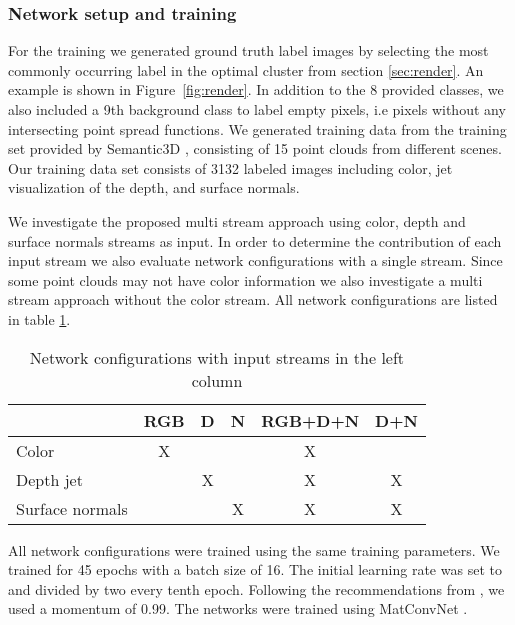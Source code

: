 \documentclass[runningheads,a4paper]{llncs}
\begin{document}
\subsubsection{Network setup and training}
For the training we generated ground truth label images by selecting the most commonly occurring label in the optimal cluster from section \ref{sec:render}. An example is shown in Figure~\ref{fig:render}. In addition to the 8 provided classes, we also included a 9th background class to label empty pixels, i.e pixels without any intersecting point spread functions. We generated training data from the training set provided by Semantic3D \cite{hackel2017semantic3d}, consisting of 15 point clouds from different scenes. Our training data set consists of 3132 labeled images including color, jet visualization of the depth, and surface normals. 

We investigate the proposed multi stream approach using color, depth and surface normals streams as input. In order to determine the contribution of each input stream we also evaluate network configurations with a single stream. Since some point clouds may not have color information we also investigate a multi stream approach without the color stream. All network configurations are listed in table \ref{tab:networks}.

\begin{table}
	\centering
	     \caption{Network configurations with input streams in the left column} \label{tab:networks}     
\begin{tabular}{l@{~}|c@{~~}c@{~~}c@{~~}c@{~~}c}  
\toprule       & {\bf RGB} & {\bf D} & {\bf N} & {\bf RGB+D+N} & {\bf D+N}  \\ \midrule  
Color	& X &  &  & X & \\ 
Depth jet &	& X & & X & X \\    
Surface normals &  & & X & X & X \\ \bottomrule  
     \end{tabular}
\end{table}



All network configurations were trained using the same training parameters. We trained for 45 epochs with a batch size of 16. The initial learning rate was set to  and divided by two every tenth epoch. Following the recommendations from \cite{liu2015parsenet}, we used a momentum of 0.99. The networks were trained using MatConvNet \cite{vedaldi15matconvnet}.
\end{document}
